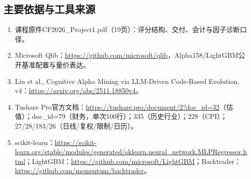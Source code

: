 \documentclass[UTF8,a4paper,10pt]{ctexart}
\begin{document}
\subsection*{主要依据与工具来源}
\begin{enumerate}\scriptsize
\item 课程原件CF2026\_Project1.pdf（19页）：评分结构、交付、会计与因子诊断口径。
\item Microsoft Qlib：\url{https://github.com/microsoft/qlib}，Alpha158/LightGBM公开基准配置与量价表达。
\item Liu et al., Cognitive Alpha Mining via LLM-Driven Code-Based Evolution, v4：\url{https://arxiv.org/abs/2511.18850v4}。
\item Tushare Pro官方文档：\url{https://tushare.pro/document/2?doc_id=32}（估值）；doc\_id=79（财务，单次100行）；335（历史行业）；228（CPI）；27/28/183/26（日线/复权/限制/日历）。
\item scikit-learn：\url{https://scikit-learn.org/stable/modules/generated/sklearn.neural_network.MLPRegressor.html}；LightGBM：\url{https://github.com/microsoft/LightGBM}；Backtrader：\url{https://github.com/mementum/backtrader}。
\end{enumerate}
\end{document}
